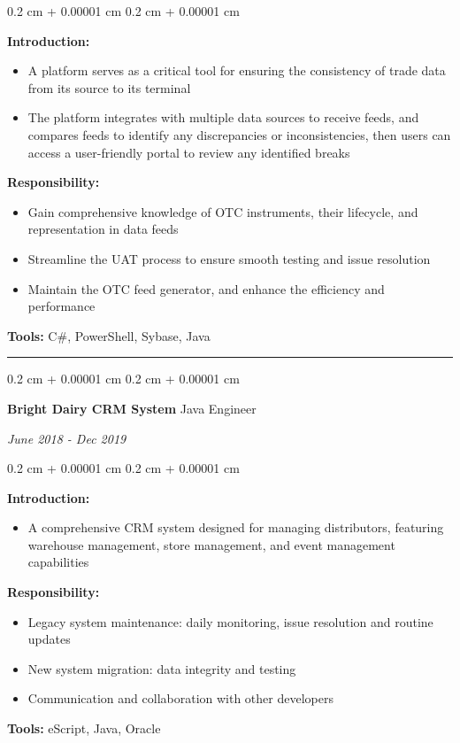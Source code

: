 \documentclass[10pt, letterpaper]{article}
\newenvironment{highlights}{
	\begin{itemize}[
		topsep=0.10 cm,
		parsep=0.10 cm,
		partopsep=0pt,
		itemsep=0pt,
		leftmargin=0.4 cm + 10pt
		]
	}{
	\end{itemize}
} %
\newenvironment{onecolentry}{
	\begin{adjustwidth}{
			0.2 cm + 0.00001 cm
		}{
			0.2 cm + 0.00001 cm
		}
	}{
	\end{adjustwidth}
} %
\newenvironment{twocolentry}[2][]{
	\onecolentry
	\def\secondColumn{#2}
	\setcolumnwidth{\fill, 4.5 cm}
	\begin{paracol}{2}
	}{
		\switchcolumn \raggedleft \secondColumn
	\end{paracol}
	\endonecolentry
} %
\begin{document}
			\vspace{0.10 cm}
			\begin{onecolentry}
				\textbf{Introduction:} 
				\begin{highlights}
					\item A platform serves as a critical tool for ensuring the consistency of trade data from its source to its terminal
					\item The platform integrates with multiple data sources to receive feeds, and compares feeds to identify any discrepancies or inconsistencies, then users can access a user-friendly portal to review any identified breaks
				\end{highlights} 
				\textbf{Responsibility:} 
				\begin{highlights}
					\item Gain comprehensive knowledge of OTC instruments, their lifecycle, and representation in data feeds
					\item Streamline the UAT process to ensure smooth testing and issue resolution
					\item Maintain the OTC feed generator, and enhance the efficiency and performance
				\end{highlights}
				\textbf{Tools:} C\#, PowerShell, Sybase, Java
			\end{onecolentry}
			\vspace{0.4 cm}
			\hrule
			\vspace{0.4 cm}
			\begin{twocolentry}{	
				\textit{June 2018 - Dec 2019}}
				\textbf{Bright Dairy CRM System}
				\space\space\space\space\space\space\space\space\space\space\space\space Java Engineer
			\end{twocolentry}
			
			\vspace{0.10 cm}
			\begin{onecolentry}
				\textbf{Introduction:} 
				\begin{highlights}
					\item A comprehensive CRM system designed for managing distributors, featuring warehouse management, store management, and event management capabilities
				\end{highlights} 
				\textbf{Responsibility:} 
				\begin{highlights}
					\item Legacy system maintenance: daily monitoring, issue resolution and routine updates
					\item New system migration: data integrity and testing
					\item Communication and collaboration with other developers
				\end{highlights}
				\textbf{Tools:} eScript, Java, Oracle 
			\end{onecolentry}
			\vspace{0.4 cm}
			\vspace{0.4 cm}
			
\end{document}
